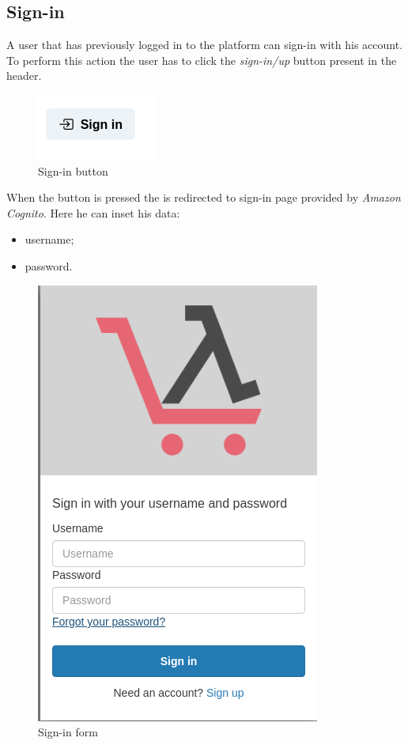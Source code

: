\subsection{Sign-in}
A user that has previously logged in to the platform can sign-in with his account. To perform this action the user has to click the \textit{sign-in/up} button present in the header.
\begin{figure}[!ht]
    \caption{Sign-in button}
    \vspace{10px}
    \includegraphics[scale=0.5]{../../../../Images/userManual/signInButton.png}
    \centering
\end{figure}
When the button is pressed the is redirected to sign-in page provided by \textit{Amazon Cognito}. Here he can inset his data:
\begin{itemize}
    \item username;
    \item password.
\end{itemize}
\begin{figure}[!ht]
    \caption{Sign-in form}
    \vspace{10px}
    \includegraphics[scale=0.3]{../../../../Images/userManual/singIN.png}
    \centering
\end{figure}
